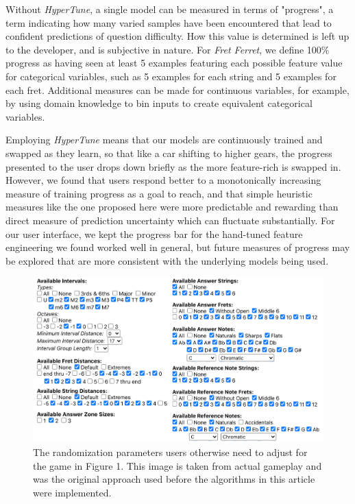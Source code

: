 \documentclass[manuscript, nonacm]{acmart_no_footer}
\begin{document}
Without \textit{HyperTune}, a single model can be measured in terms of "progress", a term indicating how many varied samples have been encountered that lead to confident predictions of question difficulty. How this value is determined is left up to the developer, and is subjective in nature. For \textit{Fret Ferret}, we define 100\% progress as having seen at least 5 examples featuring each possible feature value for categorical variables, such as 5 examples for each string and 5 examples for each fret. Additional measures can be made for continuous variables, for example, by using domain knowledge to bin inputs to create equivalent categorical variables. 

Employing \textit{HyperTune} means that our models are continuously trained and swapped as they learn, so that like a car shifting to higher gears, the progress presented to the user drops down briefly as the more feature-rich is swapped in. However, we found that users respond better to a monotonically increasing measure of training progress as a goal to reach, and that simple heuristic measures like the one proposed here were more predictable and rewarding than direct measure of prediction uncertainty which can fluctuate substantially. For our user interface, we kept the progress bar for the hand-tuned feature engineering we found worked well in general, but future measures of progress may be explored that are more consistent with the underlying models being used. 

\begin{figure}[h]
  \centering
  \includegraphics[width=\linewidth]{list_of_randomization_settings.png}
  \caption{The randomization parameters users otherwise need to adjust for the game in Figure 1. This image is taken from actual gameplay and was the original approach used before the algorithms in this article were implemented.}
  \label{fig:randomization_parameters}
\end{figure}
\end{document}
